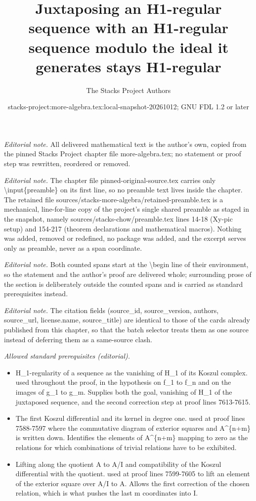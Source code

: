 \documentclass[10pt,a4paper]{amsart}
\title{Juxtaposing an H1-regular sequence with an H1-regular sequence modulo the ideal it generates stays H1-regular}
\author{The Stacks Project Authors}
\date{stacks-project:more-algebra.tex:local-snapshot-20261012; GNU FDL 1.2 or later}
\theoremstyle{plain}
\theoremstyle{definition}
\theoremstyle{remark}
\numberwithin{equation}{subsection}
\begin{document}
\maketitle
\setcounter{subsection}{1}
\noindent\textit{Editorial note.} All delivered mathematical text is the author's own, copied from the pinned Stacks Project chapter file more-algebra.tex; no statement or proof step was rewritten, reordered or removed.\par\medskip
\noindent\textit{Editorial note.} The chapter file pinned-original-source.tex carries only \textbackslash{}input\{preamble\} on its first line, so no preamble text lives inside the chapter. The retained file sources/stacks-more-algebra/retained-preamble.tex is a mechanical, line-for-line copy of the project's single shared preamble as staged in the snapshot, namely sources/stacks-chow/preamble.tex lines 14-18 (Xy-pic setup) and 154-217 (theorem declarations and mathematical macros). Nothing was added, removed or redefined, no package was added, and the excerpt serves only as preamble, never as a span coordinate.\par\medskip
\noindent\textit{Editorial note.} Both counted spans start at the \textbackslash{}begin line of their environment, so the statement and the author's proof are delivered whole; surrounding prose of the section is deliberately outside the counted spans and is carried as standard prerequisites instead.\par\medskip
\noindent\textit{Editorial note.} The citation fields (source\_id, source\_version, authors, source\_url, license.name, source\_title) are identical to those of the cards already published from this chapter, so that the batch selector treats them as one source instead of deferring them as a same-source clash.\par\medskip
\noindent\textit{Allowed standard prerequisites (editorial).}\begin{itemize}
\item H\_1-regularity of a sequence as the vanishing of H\_1 of its Koszul complex. used throughout the proof, in the hypothesis on f\_1 to f\_n and on the images of g\_1 to g\_m. Supplies both the goal, vanishing of H\_1 of the juxtaposed sequence, and the second correction step at proof lines 7613-7615.
\item The first Koszul differential and its kernel in degree one. used at proof lines 7588-7597 where the commutative diagram of exterior squares and A\textasciicircum{}\{n+m\} is written down. Identifies the elements of A\textasciicircum{}\{n+m\} mapping to zero as the relations for which combinations of trivial relations have to be exhibited.
\item Lifting along the quotient A to A/I and compatibility of the Koszul differential with the quotient. used at proof lines 7599-7605 to lift an element of the exterior square over A/I to A. Allows the first correction of the chosen relation, which is what pushes the last m coordinates into I.
\end{itemize}\medskip
\end{document}
